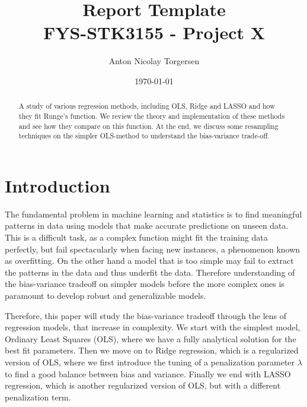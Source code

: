 \documentclass[amssymb,twocolumn,aps]{revtex4}
\begin{document}
\title{Report Template \\
    \normalsize FYS-STK3155 - Project X}
\date{\today}               
\author{
    Anton Nicolay Torgersen 
}


\newpage



    \begin{abstract}
A study of various regression methods, including OLS, Ridge and LASSO and how they fit Runge's function. 
We review the theory and implementation of these methods and see how they compare on this function.
At the end, we discuss some resampling techniques on the simpler OLS-method to understand the bias-variance trade-off.
\end{abstract}


    \maketitle
    \thispagestyle{empty} %

    


\section{Introduction}

The fundamental problem in machine learning and statistics is to find meaningful patterns in data using models that make accurate predictions on unseen data.
This is a difficult task, as a complex function might fit the training data perfectly, but fail spectacularly when facing new instances, a phenomenon known as overfitting.
On the other hand a model that is too simple may fail to extract the patterns in the data and thus underfit the data.
Therefore understanding of the bias-variance tradeoff on simpler models before the more complex ones is paramount to develop robust and generalizable models.

Therefore, this paper will study the bias-variance tradeoff through the lens of regression models, that increase in complexity.
We start with the simplest model, Ordinary Least Squares (OLS), where we have a fully analytical solution for the best fit parameters.
Then we move on to Ridge regression, which is a regularized version of OLS, where we first introduce the tuning of a penalization parameter $\lambda$ to find a good balance between bias and variance.
Finally we end with LASSO regression, which is another regularized version of OLS, but with a different penalization term.
\end{document}
